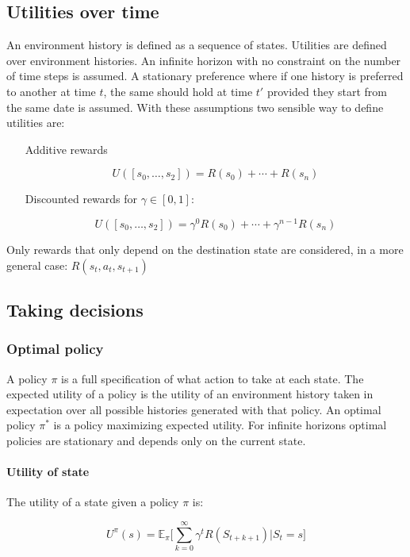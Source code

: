 	\subsection{Utilities over time}
	An environment history is defined as a sequence of states.
	Utilities are defined over environment histories.
	An infinite horizon with no constraint on the number of time steps is assumed.
	A stationary preference where if one history is preferred to another at time $t$, the same should hold at time $t'$ provided they start from the same date is assumed.
	With these assumptions two sensible way to define utilities are:

	\begin{itemize}
		\item[Additive rewards]

			$$U([s_0,\dots,s_2]) = R(s_0) + \cdots +R(s_n)$$

		\item[Discounted rewards] for $\gamma\in[0,1]$:

			$$U([s_0,\dots,s_2]) = \gamma^0R(s_0) + \cdots +\gamma^{n-1}R(s_n)$$

	\end{itemize}

	Only rewards that only depend on the destination state are considered, in a more general case: $R(s_t, a_t, s_{t+1})$

	\subsection{Taking decisions}

		\subsubsection{Optimal policy}
		A policy $\pi$ is a full specification of what action to take at each state.
		The expected utility of a policy is the utility of an environment history taken in expectation over all possible histories generated with that policy.
		An optimal policy $\pi^*$ is a policy maximizing expected utility.
		For infinite horizons optimal policies are stationary and depends only on the current state.

			\paragraph{Utility of state}
			The utility of a state given a policy $\pi$ is:

			$$U^\pi(s) = \mathbb{E}_\pi\biggl[\sum\limits_{k=0}^\infty\gamma^tR(S_{t+k+1})|S_t=s\biggr]$$

